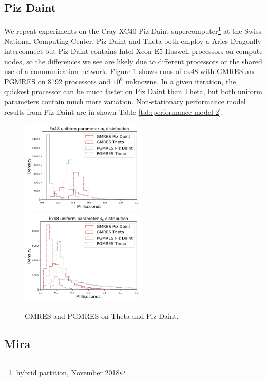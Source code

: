 \documentclass[sigconf]{acmart}
\begin{document}
\subsection{Piz Daint}\label{sec:pizdaint}

We repeat experiments on the Cray XC40 Piz Daint supercomputer\footnote{hybrid partition, November 2018} at the Swiss National Computing Center. 
Piz Daint and Theta both employ a Aries Dragonfly interconnect but Piz Daint contains Intel Xeon E5 Haswell  processors \cite{hammarlund2014haswell} on compute nodes, so the differences we see are likely due to different processors or the shared use of a communication network.
Figure \ref{fig:pizdaint} shows runs of ex48 with GMRES and PGMRES on 8192 processors and $10^6$ unknowns. 
In a given iteration, the quickest processor can be much faster on Piz Daint than Theta, but both uniform parameters contain much more variation.
Non-stationary performance model results from Piz Daint are in shown Table \ref{tab:performance-model-2}.

\begin{figure}[b]
\centering
\includegraphics[width=6cm]{../plots/THETA_PIZDAINT_ex48_8192_1000000_uniform_a_k.png} 
\includegraphics[width=6cm]{../plots/THETA_PIZDAINT_ex48_8192_1000000_uniform_s_k.png}
\caption{GMRES and PGMRES on Theta and Piz Daint.} \label{fig:pizdaint}
\end{figure}


\subsection{Mira}\label{sec:mira}
\end{document}
